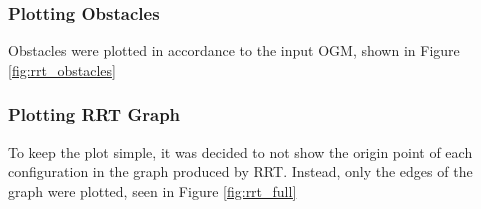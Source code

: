     \subsubsection{Plotting Obstacles}
        Obstacles were plotted in accordance to the input \gls{OGM}, shown in Figure \ref{fig:rrt_obstacles}

    \subsubsection{Plotting RRT Graph}
        To keep the plot simple, it was decided to not show the origin point of each configuration in the graph produced by \gls{RRT}. Instead, only the edges of the graph were plotted, seen in Figure \ref{fig:rrt_full}
        
        
